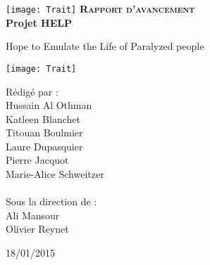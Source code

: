 \begingroup
\thispagestyle{empty}
\begin{center}
\vspace*{5.5cm}
\texttt{[image: Trait]}
{\Huge \textsc{\textbf{Rapport d'avancement}}}\\
\vspace*{1cm}
{\Huge \textbf{Projet HELP}}\par %
\vspace*{1cm}
{\huge Hope to Emulate the Life of Paralyzed people}\par %
\texttt{[image: Trait]}
\end{center}
\vspace*{1.3cm}

\begin{multicols}{2}
{\setlength{\baselineskip}{1.5\baselineskip}
{\Large Rédigé par :\\
Hussain Al Othman\\
Katleen Blanchet\\
Titouan Boulmier\\
Laure Dupasquier\\
Pierre Jacquot\\
Marie-Alice Schweitzer\\
\columnbreak\\
\hspace*{1cm}
Sous la direction de :\\
\hspace*{1cm}
Ali Mansour\\
\hspace*{1cm}
Olivier Reynet\\}
\par}
\end{multicols}

\vspace*{1cm}
\begin{center}
\large
18/01/2015
\end{center}


\endgroup
